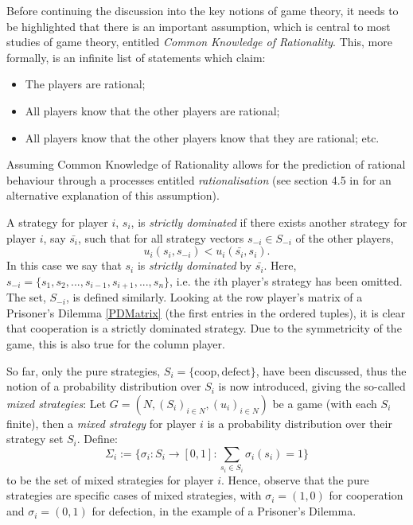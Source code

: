 Before continuing the discussion into the key notions of game theory, it needs
to be highlighted that there is an important assumption, which is central to
most studies of game theory, entitled \textit{Common Knowledge of Rationality}.
This, more formally, is an infinite list of statements which claim:
    \begin{itemize}
        \item The players are rational;
        \item All players know that the other players are rational;
        \item All players know that the other players know that they are rational; etc.    
    \end{itemize}
Assuming Common Knowledge of Rationality allows for the prediction of rational
behaviour through a processes entitled \textit{rationalisation} \cite{Knight2019}
(see section 4.5 in \cite{maschler_solan_zamir_2013} for an alternative
explanation of this assumption). 


A strategy for player $i$, $s_{i}$, is \textit{strictly dominated} if there
exists another strategy for player $i$, say $\bar{s_{i}}$, such that for all
strategy vectors $s_{-i} \in S_{-i}$ of the other players, 
$$
    u_{i}(s_{i}, s_{-i}) < u_{i}(\bar{s_{i}}, s_{i}).
$$
In this case we say that $s_{i}$ is \textit{strictly dominated} by
$\bar{s_{i}}$. Here, $s_{-i} = \{s_{1}, s_{2}, ..., s_{i-1}, s_{i+1}, ...,
s_{n}\}$, i.e. the $i$th player's strategy has been omitted. The set, $S_{-i}$,
is defined similarly. Looking at the row player's matrix of a Prisoner's Dilemma
\ref{PDMatrix} (the first entries in the ordered tuples), it is clear that
cooperation is a strictly dominated strategy. Due to the symmetricity of the
game, this is also true for the column player. \cite{maschler_solan_zamir_2013}



So far, only the pure strategies, $S_{i}=\{\text{coop}, \text{defect}\}$, have
been discussed, thus the notion of a probability distribution over $S_{i}$ is
now introduced, giving the so-called \textit{mixed strategies}:
Let $G=(N, (S_{i})_{i \in N}, (u_{i})_{i \in N})$ be a game (with each $S_{i}$
finite), then a \textit{mixed strategy} for player $i$ is a probability
distribution over their strategy set $S_{i}$. Define:
$$
\Sigma_{i} := \{\sigma_{i} : S_{i} \to [0, 1] : \sum_{s_{i} \in S_{i}}{\sigma_{i}(s_{i})} = 1\}   
$$
to be the set of mixed strategies for player $i$. Hence, observe that the pure
strategies are specific cases of mixed strategies, with $\sigma_{i} = (1, 0)$
for cooperation and $\sigma_{i} = (0, 1)$ for defection, in the example of a
Prisoner's Dilemma. \cite{maschler_solan_zamir_2013}

